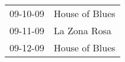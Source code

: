 \begin{supertabular}{p{0.07\textwidth}p{0.23\textwidth}}
 09-10-09 &  House of Blues \\
 09-11-09 &    La Zona Rosa \\
 09-12-09 &  House of Blues \\
\end{supertabular}
